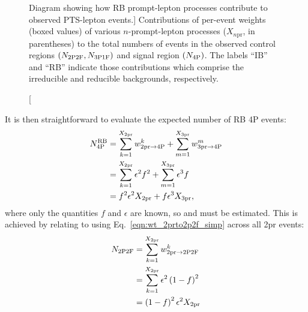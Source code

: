 \begin{figure}
	\caption
		[Diagram showing how RB prompt-lepton processes contribute to observed PTS-lepton events.]
		{Contributions of per-event weights (boxed values) of various $n$-prompt-lepton processes ($X_{n\text{pr}}$, in parentheses) to the total numbers of events in the observed control regions $\left( N_{\text{2P2F}}, N_{\text{3P1F}} \right)$ and signal region $\left( N_\text{4P} \right)$.
		The labels ``IB'' and ``RB'' indicate those contributions which comprise the irreducible and reducible backgrounds, respectively.}
		\label{fig:prompt_to_crs}
\end{figure}

It is then straightforward to evaluate the expected number of RB 4P events:
\begin{align}
	\label{eqn:n4p_x2x3}
	N_\text{4P}^\text{RB}
	&= \sum_{k=1}^{X_{2\text{pr}}} w_{\text{2pr} \to \text{4P}}^k + \sum_{m=1}^{X_{3\text{pr}}} w_{\text{3pr} \to \text{4P}}^m
	\notag
	\\
	&= \sum_{k=1}^{X_{2\text{pr}}} \epsilon^2 f^2 + \sum_{m=1}^{X_{3\text{pr}}} \epsilon^3 f
	\notag
	\\
	&= f^2 \epsilon^2 X_{2\text{pr}} + f \epsilon^3 X_{3\text{pr}},
\end{align}
where only the quantities $f$ and $\epsilon$ are known, so \xtwoprompt and \xthreeprompt must be estimated.
This is achieved by relating \xtwoprompt to \ntwoPtwoF using Eq.~\ref{eqn:wt_2prto2p2f_simp} across all 2pr events:
\begin{align}
	\label{eqn:n2p2f_x2}
	N_{\text{2P2F}}
	&= \sum_{k=1}^{X_{2\text{pr}}} w_{\text{2pr} \to \text{2P2F}}^k
	\notag
	\\
	&= \sum_{k=1}^{X_{2\text{pr}}} \epsilon^2 \left( 1-f \right)^2
	\notag
	\\
	&= \left( 1-f \right)^2 \epsilon^2 X_{2\text{pr}}
\end{align}

